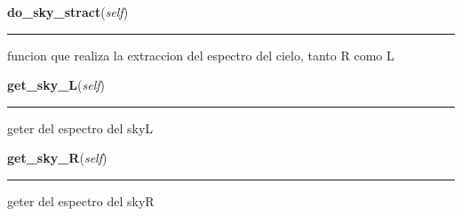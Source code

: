     \label{spectro_metria:spect:do_sky_stract}

    \vspace{0.5ex}

\hspace{.8\funcindent}\begin{boxedminipage}{\funcwidth}

    \raggedright \textbf{do\_sky\_stract}(\textit{self})

    \vspace{-1.5ex}

    \rule{\textwidth}{0.5\fboxrule}
\setlength{\parskip}{2ex}
    funcion que realiza la extraccion del espectro del cielo, tanto R como 
    L

\setlength{\parskip}{1ex}
    \end{boxedminipage}

    \label{spectro_metria:spect:get_sky_L}

    \vspace{0.5ex}

\hspace{.8\funcindent}\begin{boxedminipage}{\funcwidth}

    \raggedright \textbf{get\_sky\_L}(\textit{self})

    \vspace{-1.5ex}

    \rule{\textwidth}{0.5\fboxrule}
\setlength{\parskip}{2ex}
    geter del espectro del skyL

\setlength{\parskip}{1ex}
    \end{boxedminipage}

    \label{spectro_metria:spect:get_sky_R}

    \vspace{0.5ex}

\hspace{.8\funcindent}\begin{boxedminipage}{\funcwidth}

    \raggedright \textbf{get\_sky\_R}(\textit{self})

    \vspace{-1.5ex}

    \rule{\textwidth}{0.5\fboxrule}
\setlength{\parskip}{2ex}
    geter del espectro del skyR

\setlength{\parskip}{1ex}
    \end{boxedminipage}

